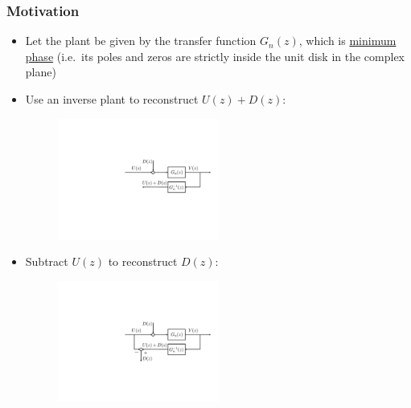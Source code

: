 \begin{frame}
    \frametitle{Motivation}
    \begin{itemize}
    \item
    Let the plant be given by the transfer function $G_n(z)$, which is \underline{minimum phase} (i.e.\ its poles and zeros are strictly inside the unit disk in the complex plane)
    \pause

    \item
    Use an inverse plant to reconstruct $U(z) + D(z)$:
    \begin{figure}
        \includegraphics[width=0.5\textwidth]{Disturbance_Observer_motiv2}\\
    \end{figure}
    \pause

    \item
    Subtract $U(z)$ to reconstruct $D(z)$:
    \begin{figure}
        \includegraphics[width=0.5\textwidth]{Disturbance_Observer_motiv3}\\
    \end{figure}

    \end{itemize}
\end{frame}

